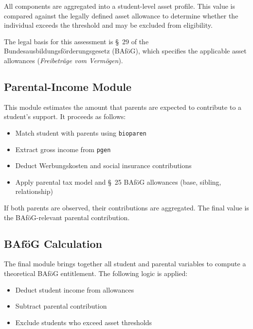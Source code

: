 All components are aggregated into a student-level asset profile. This value is compared against the legally defined asset allowance to determine whether the individual exceeds the threshold and may be excluded from eligibility.

The legal basis for this assessment is §~29 of the Bundesausbildungsförderungsgesetz (BAföG), which specifies the applicable asset allowances (\emph{Freibeträge vom Vermögen}).

\subsection{Parental-Income Module}

This module estimates the amount that parents are expected to contribute to a student's support. It proceeds as follows:

\begin{itemize}
  \item Match student with parents using \texttt{bioparen}
  \item Extract gross income from \texttt{pgen}
  \item Deduct Werbungskosten and social insurance contributions
  \item Apply parental tax model and §~25 BAföG allowances (base, sibling, relationship)
\end{itemize}

If both parents are observed, their contributions are aggregated. The final value is the BAföG-relevant parental contribution.

\subsection{BAföG Calculation}

The final module brings together all student and parental variables to compute a theoretical BAföG entitlement. The following logic is applied:

\begin{itemize}
  \item Deduct student income from allowances
  \item Subtract parental contribution
  \item Exclude students who exceed asset thresholds
\end{itemize}

